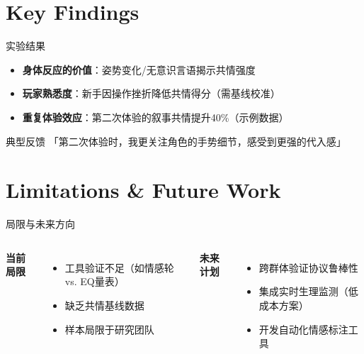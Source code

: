 \documentclass[aspectratio=169,xcolor=dvipsnames]{beamer}
\begin{document}
\section{Key Findings}

\begin{frame}{实验结果}
    \begin{itemize}
        \item \textbf{身体反应的价值}：姿势变化/无意识言语揭示共情强度
        \item \textbf{玩家熟悉度}：新手因操作挫折降低共情得分（需基线校准）
        \item \textbf{重复体验效应}：第二次体验的叙事共情提升40\%（示例数据）
    \end{itemize}
    
    \begin{exampleblock}{典型反馈}
        「第二次体验时，我更关注角色的手势细节，感受到更强的代入感」
    \end{exampleblock}
\end{frame}

\section{Limitations \& Future Work}

\begin{frame}{局限与未来方向}
    \begin{columns}[t]
        \textbf{当前局限}
        \begin{itemize}
            \item 工具验证不足（如情感轮 vs. EQ量表）
            \item 缺乏共情基线数据
            \item 样本局限于研究团队
        \end{itemize}
        
        \textbf{未来计划}
        \begin{itemize}
            \item 跨群体验证协议鲁棒性
            \item 集成实时生理监测（低成本方案）
            \item 开发自动化情感标注工具
        \end{itemize}
    \end{columns}
\end{frame}
\end{document}
